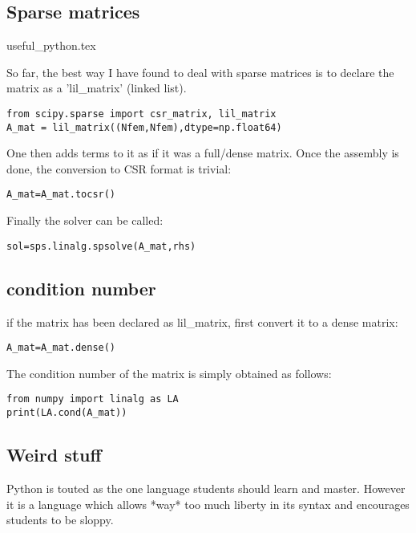 


\subsection{Sparse matrices}
\begin{flushright} {\tiny {\color{gray} useful\_python.tex}} \end{flushright}

So far, the best way I have found to deal with sparse matrices is to 
declare the matrix as a 'lil\_matrix' (linked list).

\begin{lstlisting}
from scipy.sparse import csr_matrix, lil_matrix
A_mat = lil_matrix((Nfem,Nfem),dtype=np.float64)
\end{lstlisting}

One then adds terms to it as if it was a full/dense matrix. 
Once the assembly is done, the conversion to CSR format is trivial:

\begin{lstlisting}
A_mat=A_mat.tocsr()
\end{lstlisting}

Finally the solver can be called:

\begin{lstlisting}
sol=sps.linalg.spsolve(A_mat,rhs)
\end{lstlisting}

\subsection{condition number}

if the matrix has been declared as lil\_matrix, first convert it to a dense matrix:
\begin{lstlisting}
A_mat=A_mat.dense()
\end{lstlisting}
The condition number of the matrix is simply obtained as follows:
\begin{lstlisting}
from numpy import linalg as LA
print(LA.cond(A_mat))
\end{lstlisting}

\subsection{Weird stuff}

Python is touted as the one language students should learn and master. However it is a language which allows *way* too much liberty in its syntax and encourages students to be sloppy. 

